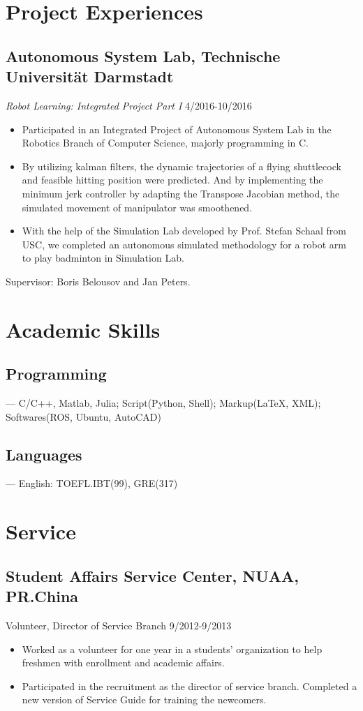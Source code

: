 \documentclass{article}
\begin{document}
\section{Project Experiences}
\subsection{Autonomous System Lab, Technische Universit\"at Darmstadt \\}
\emph{Robot Learning: Integrated Project Part I }\hfill 4/2016-10/2016
\begin{itemize}[noitemsep,topsep=1pt]
\item Participated in an Integrated Project of Autonomous System Lab in the Robotics Branch of Computer Science, majorly programming in  C.
\item By utilizing kalman filters, the dynamic trajectories of a flying shuttlecock and feasible hitting position were predicted. And by implementing the minimum jerk controller by adapting the Transpose Jacobian method, the simulated movement of manipulator was smoothened.
\item With the help of the Simulation Lab developed by Prof. Stefan Schaal from USC, we completed an autonomous simulated methodology for a robot arm to play badminton in Simulation Lab.
\end{itemize}
Supervisor: Boris Belousov and Jan Peters.

\section{Academic Skills}
\subsection{Programming}
--- C/C++, Matlab, Julia; Script(Python, Shell); Markup({\LaTeX}, XML); Softwares(ROS, Ubuntu, AutoCAD)
\subsection{Languages}
--- English: TOEFL.IBT(99), GRE(317)

\section{Service}
\subsection{Student Affairs Service Center, NUAA, PR.China\\}
Volunteer, Director of Service Branch \hfill9/2012-9/2013
\begin{itemize}[noitemsep,topsep=1pt]
\item Worked as a volunteer for one year in a students' organization to help freshmen with enrollment and academic affairs.
\item Participated in the recruitment as the director of service branch. Completed a new version of Service Guide for training the newcomers.   
\end{itemize}
\end{document}
